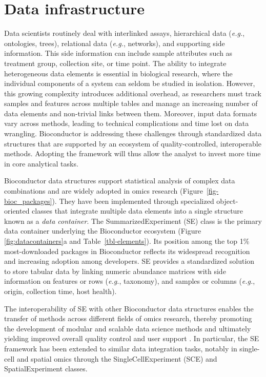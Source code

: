 \documentclass[
  sn-nature,
]{sn-jnl}
\begin{document}
\section{Data infrastructure}\label{sec-infra}

Data scientists routinely deal with interlinked assays, hierarchical
data (\emph{e.g.}, ontologies, trees), relational data (\emph{e.g.},
networks), and supporting side information. This side information can
include sample attributes such as treatment group, collection site, or
time point. The ability to integrate heterogeneous data elements is
essential in biological research, where the individual components of a
system can seldom be studied in isolation. However, this growing
complexity introduces additional overhead, as researchers must track
samples and features across multiple tables and manage an increasing
number of data elements and non-trivial links between them. Moreover,
input data formats vary across methods, leading to technical
complications and time lost on data wrangling. Bioconductor is
addressing these challenges through standardized data structures that
are supported by an ecosystem of quality-controlled, interoperable
methods. Adopting the framework will thus allow the analyst to invest
more time in core analytical tasks.

Bioconductor data structures support statistical analysis of complex
data combinations \citep{huber2015} and are widely adopted in omics
research (Figure~\ref{fig-bioc_packages}). They have been implemented
through specialized object-oriented classes that integrate multiple data
elements into a single structure known as a \emph{data container}. The
SummarizedExperiment (SE) class \citep{huber2015} is the primary data
container underlying the Bioconductor ecosystem (Figure
\ref{fig:datacontainers}a and Table~\ref{tbl-elements}). Its position
among the top 1\% most-downloaded packages in Bioconductor reflects its
widespread recognition and increasing adoption among developers. SE
provides a standardized solution to store tabular data by linking
numeric abundance matrices with side information on features or rows
(\emph{e.g.}, taxonomy), and samples or columns (\emph{e.g.}, origin,
collection time, host health).

The interoperability of SE with other Bioconductor data structures
enables the transfer of methods across different fields of omics
research, thereby promoting the development of modular and scalable data
science methods and ultimately yielding improved overall quality control
and user support \citep{drnevich2025}. In particular, the SE framework
has been extended to similar data integration tasks, notably in
single-cell and spatial omics through the SingleCellExperiment (SCE)
\citep{amezquita2020} and SpatialExperiment \citep{righelli2022}
classes.
\end{document}
